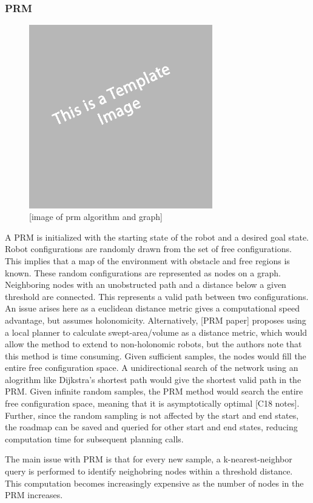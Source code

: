 \documentclass[12pt]{article}
\begin{document}
        \subsubsection{PRM}
            \begin{figure}[ht]
                \includegraphics[width=8cm]{temp}
                \centering
                \caption{[image of prm algorithm and graph]}
            \end{figure}
            A PRM is initialized with the starting state of the robot and a desired goal state. Robot configurations are randomly drawn from the set of free configurations. This implies that a map of the environment with obstacle and free regions is known. These random configurations are represented as nodes on a graph. Neighboring nodes with an unobstructed path and a distance below a given threshold are connected. This represents a valid path between two configurations. An issue arises here as a euclidean distance metric gives a computational speed advantage, but assumes holonomicity. Alternatively, [PRM paper] proposes using a local planner to calculate swept-area/volume as a distance metric, which would allow the method to extend to non-holonomic robots, but the authors note that this method is time consuming. Given sufficient samples, the nodes would fill the entire free configuration space. A unidirectional search of the network using an alogrithm like Dijkstra's shortest path would give the shortest valid path in the PRM. Given infinite random samples, the PRM method would search the entire free configuration space, meaning that it is asymptotically optimal [C18 notes]. Further, since the random sampling is not affected by the start and end states, the roadmap can be saved and queried for other start and end states, reducing computation time for subsequent planning calls. 
            \par The main issue with PRM is that for every new sample, a k-nearest-neighbor query is performed to identify neighobring nodes within a threshold distance. This computation becomes increasingly expensive as the number of nodes in the PRM increases. 
        \fi
\end{document}
